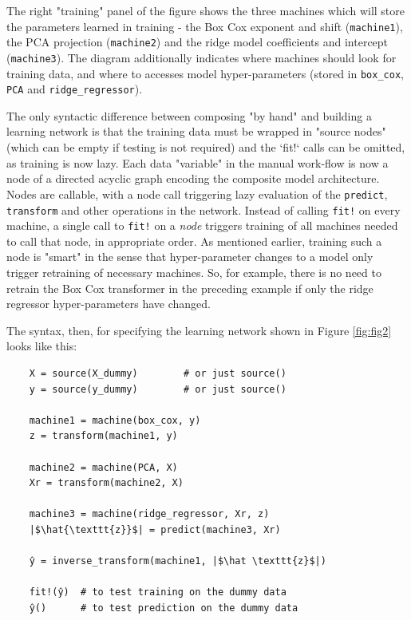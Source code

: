 \documentclass{article}
\begin{document}
The right "training" panel of the figure shows the three machines
which will store the parameters learned in training - the Box Cox
exponent and shift (\texttt{machine1}), the PCA projection
(\texttt{machine2}) and the ridge model coefficients and intercept
(\texttt{machine3}). The diagram additionally indicates where machines
should look for training data, and where to accesses model
hyper-parameters (stored in \texttt{box\_cox}, \texttt{PCA} and
\texttt{ridge\_regressor}).

The only syntactic difference between composing "by hand" and building
a learning network is that the training data must be wrapped in
"source nodes" (which can be empty if testing is not required) and the
`fit!` calls can be omitted, as training is now lazy. Each data
"variable" in the manual work-flow is now a node of a directed acyclic
graph encoding the composite model architecture. Nodes are callable,
with a node call triggering lazy evaluation of the \texttt{predict},
\texttt{transform} and other operations in the network. Instead of
calling \texttt{fit!} on every machine, a single call to \texttt{fit!}
on a \textit{node} triggers training of all machines needed to call
that node, in appropriate order. As mentioned earlier, training such a
node is "smart" in the sense that hyper-parameter changes to a model
only trigger retraining of necessary machines. So, for example, there
is no need to retrain the Box Cox transformer in the preceding example
if only the ridge regressor hyper-parameters have changed.

The syntax, then, for specifying the learning network shown in Figure
\ref{fig:fig2} looks like this:

\begin{verbatim}
    X = source(X_dummy)        # or just source()
    y = source(y_dummy)        # or just source()

    machine1 = machine(box_cox, y)
    z = transform(machine1, y)

    machine2 = machine(PCA, X)
    Xr = transform(machine2, X)

    machine3 = machine(ridge_regressor, Xr, z)
    |$\hat{\texttt{z}}$| = predict(machine3, Xr)

    ŷ = inverse_transform(machine1, |$\hat \texttt{z}$|)

    fit!(ŷ)  # to test training on the dummy data
    ŷ()      # to test prediction on the dummy data
\end{verbatim}
\end{document}
